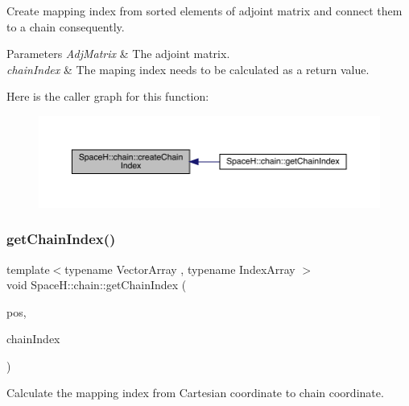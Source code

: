 Create mapping index from sorted elements of adjoint matrix and connect them to a chain consequently. 
\begin{DoxyParams}{Parameters}
{\em Adj\+Matrix} & The adjoint matrix. \\
\hline
{\em chain\+Index} & The maping index needs to be calculated as a return value. \\
\hline
\end{DoxyParams}
Here is the caller graph for this function\+:\nopagebreak
\begin{figure}[H]
\begin{center}
\leavevmode
\includegraphics[width=350pt]{namespace_space_h_1_1chain_a65d906373401066033d8e4a6ad581cce_icgraph}
\end{center}
\end{figure}
\mbox{\label{namespace_space_h_1_1chain_a9f1ed51f097bc8cf691a87b97639dde9}} 
\subsubsection{\texorpdfstring{get\+Chain\+Index()}{getChainIndex()}}
{\footnotesize\ttfamily template$<$typename Vector\+Array , typename Index\+Array $>$ \\
void Space\+H\+::chain\+::get\+Chain\+Index (\begin{DoxyParamCaption}\item[{const Vector\+Array \&}]{pos,  }\item[{Index\+Array \&}]{chain\+Index }\end{DoxyParamCaption})}



Calculate the mapping index from Cartesian coordinate to chain coordinate. 

